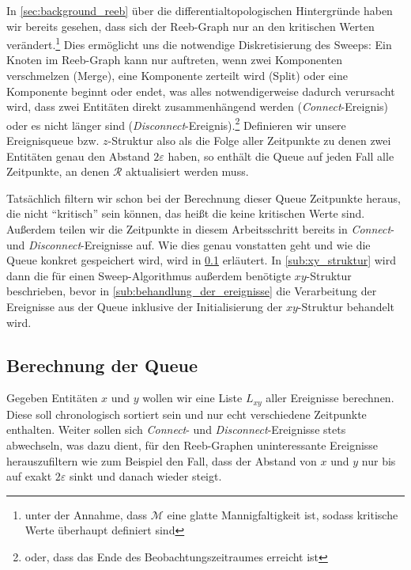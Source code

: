 In \cref{sec:background_reeb} über die differentialtopologischen Hintergründe haben wir bereits gesehen, dass sich der Reeb-Graph nur an den kritischen Werten verändert.\footnote{unter der Annahme, dass $\mathcal{M}$ eine glatte Mannigfaltigkeit ist, sodass kritische Werte überhaupt definiert sind}
Dies ermöglicht uns die notwendige Diskretisierung des Sweeps: Ein Knoten im Reeb-Graph kann nur auftreten, wenn zwei Komponenten verschmelzen (Merge), eine Komponente zerteilt wird (Split) oder eine Komponente beginnt oder endet, was alles notwendigerweise dadurch verursacht wird, dass zwei Entitäten direkt zusammenhängend werden (\emph{Connect}-Ereignis) oder es nicht länger sind (\emph{Disconnect}-Ereignis).\footnote{oder, dass das Ende des Beobachtungszeitraumes erreicht ist}
Definieren wir unsere Ereignisqueue bzw. $z$-Struktur also als die Folge aller Zeitpunkte zu denen zwei Entitäten genau den Abstand $2 \varepsilon$ haben, so enthält die Queue auf jeden Fall alle Zeitpunkte, an denen $\mathcal{R}$ aktualisiert werden muss.

Tatsächlich filtern wir schon bei der Berechnung dieser Queue Zeitpunkte heraus, die nicht \enquote{kritisch} sein können, das heißt die keine kritischen Werte sind.
Außerdem teilen wir die Zeitpunkte in diesem Arbeitsschritt bereits in \emph{Connect}- und \emph{Disconnect}-Ereignisse auf.
Wie dies genau vonstatten geht und wie die Queue konkret gespeichert wird, wird in \cref{sub:berechnung_queue} erläutert.
In \cref{sub:xy_struktur} wird dann die für einen Sweep-Algorithmus außerdem benötigte $xy$-Struktur beschrieben, bevor in \cref{sub:behandlung_der_ereignisse} die Verarbeitung der Ereignisse aus der Queue inklusive der Initialisierung der $xy$-Struktur behandelt wird.


\subsection{Berechnung der Queue} %
\label{sub:berechnung_queue}
Gegeben Entitäten $x$ und $y$ wollen wir eine Liste $L_{xy}$ aller Ereignisse berechnen.
Diese soll chronologisch sortiert sein und nur echt verschiedene Zeitpunkte enthalten.
Weiter sollen sich \emph{Connect}- und \emph{Disconnect}-Ereignisse stets abwechseln, was dazu dient, für den Reeb-Graphen uninteressante Ereignisse herauszufiltern wie zum Beispiel den Fall, dass der Abstand von $x$ und $y$ nur bis auf exakt $2 \varepsilon$ sinkt und danach wieder steigt.

